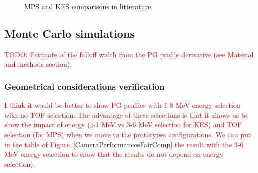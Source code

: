 \documentclass[a4paper,english]{article}
\begin{document}
\begin{figure}[htp]
  \centering
  \quad
  \caption{\label{LitteratureComp} MPS and KES comparisons in litterature.}
\end{figure}   

\subsection{Monte Carlo simulations}

\textcolor{red}{TODO: Estimate of the falloff width from the PG profile derivative (see Material and methods section).}

\subsubsection{Geometrical considerations verification}

\textcolor{red}{I think it would be better to show PG profiles with 1-8 MeV energy selection with no TOF selection. The advantage of these selections is that it allows us to show the impact of energy (>1 MeV vs 3-6 MeV selection for KES) and TOF selection (for MPS) when we move to the prototypes configurations. We can put in the table of Figure~\ref{CameraPerformancesFairComp} the result with the 3-6 MeV energy selection to show that the results do not depend on energy selection).}
\end{document}
